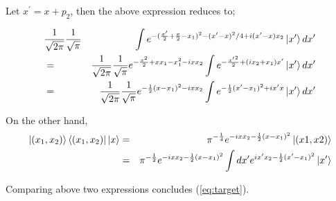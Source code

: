 \documentclass[uplatex]{jsarticle}
\begin{document}
Let $x^\prime = x + p_2$, then the above expression reduces to;

\begin{eqnarray}
&\frac{1}{\sqrt{2\pi}}\frac{1}{\sqrt{\pi}}&
\int e^{-(\frac{x^\prime}{2} + \frac{x}{2} - x_1)^2 
- (x^\prime - x)^2 / 4 + i (x^\prime - x) x_2} \ket{x^\prime} dx^\prime
 \nonumber\\
&=&
\frac{1}{\sqrt{2\pi}}\frac{1}{\sqrt{\pi}}
e^{-\frac{x^2}{2} + xx_1 - x_1^2 -ixx_2} \int e^{-\frac{{x^\prime}^2}{2} +
(ix_2 + x_1)x^\prime}\ket{x^\prime}dx^\prime \nonumber \\
&=& 
\frac{1}{\sqrt{2\pi}}\frac{1}{\sqrt{\pi}}
e^{-\frac{1}{2}(x - x_1)^2 - ixx_2} \int e^{-\frac{1}{2}(x^\prime -
x_1)^2 + ix^\prime x} \ket{x^\prime} dx^\prime
\end{eqnarray}

On the other hand, 
\begin{eqnarray}
\ket{(x_1, x_2)}\bra{(x_1, x_2)}\ket{x} &=& 
\pi^{-\frac{1}{4}} e^{-ixx_2 - \frac{1}{2}(x - x_1)^2}\ket{(x1, x2)}
\nonumber \\
&=& \pi^{-\frac{1}{2}} e^{-ixx_2 - \frac{1}{2}(x - x_1)^2}
\int dx^\prime e^{ix^\prime x_2 - \frac{1}{2}(x^\prime - x_1)^2} \ket{x^\prime}
\end{eqnarray}

Comparing above two expressions concludes (\ref{eq:target}).
\end{document}
